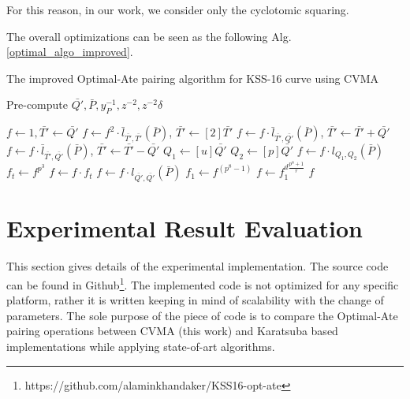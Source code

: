 For this reason, in our work, we consider only the cyclotomic squaring.

The overall optimizations can be seen as the following Alg. \ref{optimal_algo_improved}.

\begin{algorithm}[!h]
	\caption{The improved Optimal-Ate pairing algorithm for KSS-16 curve using CVMA}
	\label{optimal_algo_improved}
	\DontPrintSemicolon

	\nl Pre-compute $\bar{Q'},\bar{P},y_{P}^{-1}, z^{-2}, z^{-2}\delta$ 
	
	\nl $f \leftarrow 1, \bar{T'} \leftarrow \bar{Q'}$\;
	\nl {} {
		\nl $f\leftarrow f^2\cdot \bar{l}_{\bar{T'},\bar{T'}}(\bar{P}) $, $ \bar{T'} \leftarrow [2] \bar{T'} $ 
		\nl {} {
			\nl $f\leftarrow f\cdot \bar{l}_{\bar{T'},\bar{Q'}}(\bar{P})$, $ \bar{T'} \leftarrow  \bar{T'} + \bar{Q'} $ }
		\nl {} {
			\nl $f\leftarrow f\cdot \bar{l}_{\bar{T'},\bar{Q'}}(\bar{P})$, $ \bar{T'} \leftarrow  \bar{T'} - \bar{Q'} $}} 
	\nl $Q_1\leftarrow [u]\bar{Q'}$  
	\nl $Q_2\leftarrow [p]\bar{Q'}$ 
	\nl $f\leftarrow f\cdot l_{Q_1,Q_2}(\bar{P})$ 
	\nl $f_t\leftarrow f^{p^3}$   
	\nl $f\leftarrow f\cdot f_t$ 
	\nl $f\leftarrow f\cdot l_{\bar{Q'},\bar{Q'}}(\bar{P})$ 
	\nl $f_1\leftarrow f^{(p^{8}-1)}$  
	\nl $f\leftarrow f_1^{d\frac{p^{8}+1}{r}}$  
	 $f$\;
\end{algorithm}


\section{Experimental Result Evaluation}\label{sec:4}
This section gives details of the experimental implementation. 
The source code can be found in Github\footnote{\label{source}https://github.com/alaminkhandaker/KSS16-opt-ate}. 
The implemented code is not optimized for any specific platform, rather it is written keeping in mind of scalability with the change of parameters.
The sole purpose of the piece of code is to compare the Optimal-Ate pairing operations between CVMA (this work) and Karatsuba based implementations \cite{INDOCRYPT:KNGDNK17} while applying state-of-art algorithms.

